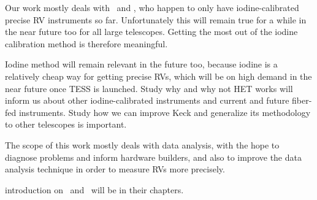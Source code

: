 Our work mostly deals with \het\ and \keck, who happen to only have
iodine-calibrated precise RV instruments so far. Unfortunately this
will remain true for a while in the near future too for all large
telescopes. Getting the most out of the iodine calibration method is
therefore meaningful. 

Iodine method will remain relevant in the future too,
because iodine is a relatively cheap way for getting precise RVs,
which will be on high demand in the near future once TESS is
launched. Study why and why not HET works will inform us about other
iodine-calibrated instruments and current and future fiber-fed
instruments. Study how we can improve Keck and generalize its methodology
to other telescopes is important.

The scope of this work mostly deals with data analysis, with the hope
to diagnose problems and inform hardware builders, and also to improve
the data analysis technique in order to measure RVs more precisely.

introduction on \het\ and \keck\ will be in their chapters.